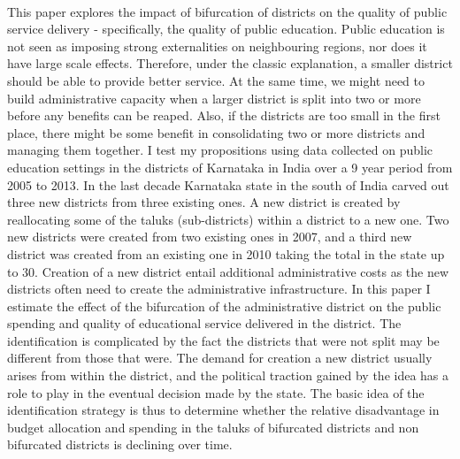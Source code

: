 \documentclass[12pt, a4paper]{article}
\begin{document}
\paragraph{}This paper explores the impact of bifurcation of districts on the quality of public service delivery - specifically, the quality of public education. Public education is not seen as imposing strong externalities on neighbouring regions, nor does it have large scale effects. Therefore, under the classic explanation, a smaller district should be able to provide better service. At the same time, we might need to build administrative capacity when a larger district is split into two or more before any benefits can be reaped. Also, if the districts are too small in the first place, there might be some benefit in consolidating two or more districts and managing them together. I test my propositions using data collected on public education settings in the districts of Karnataka in India over a 9 year period from 2005 to 2013. In the last decade Karnataka state in the south of India carved out three new districts from three existing ones. A new district is created by reallocating some of the taluks (sub-districts) within a district to a new one. Two new districts were created from two existing ones in 2007, and a third new district was created from an existing one in 2010 taking the total in the state up to 30. Creation of a new district entail additional administrative costs as the new districts often need to create the administrative infrastructure. In this paper I estimate the effect of the bifurcation of the administrative district on the public spending and quality of educational service delivered in the district. The identification is complicated by the fact the districts that were not split may be different from those that were. The demand for creation a new district usually arises from within the district, and the political traction gained by the idea has a role to play in the eventual decision made by the state. The basic idea of the identification strategy is thus to determine whether the relative disadvantage in budget allocation and spending in the taluks of bifurcated districts and non bifurcated districts is declining over time.
	
\printbibliography
\end{document}
